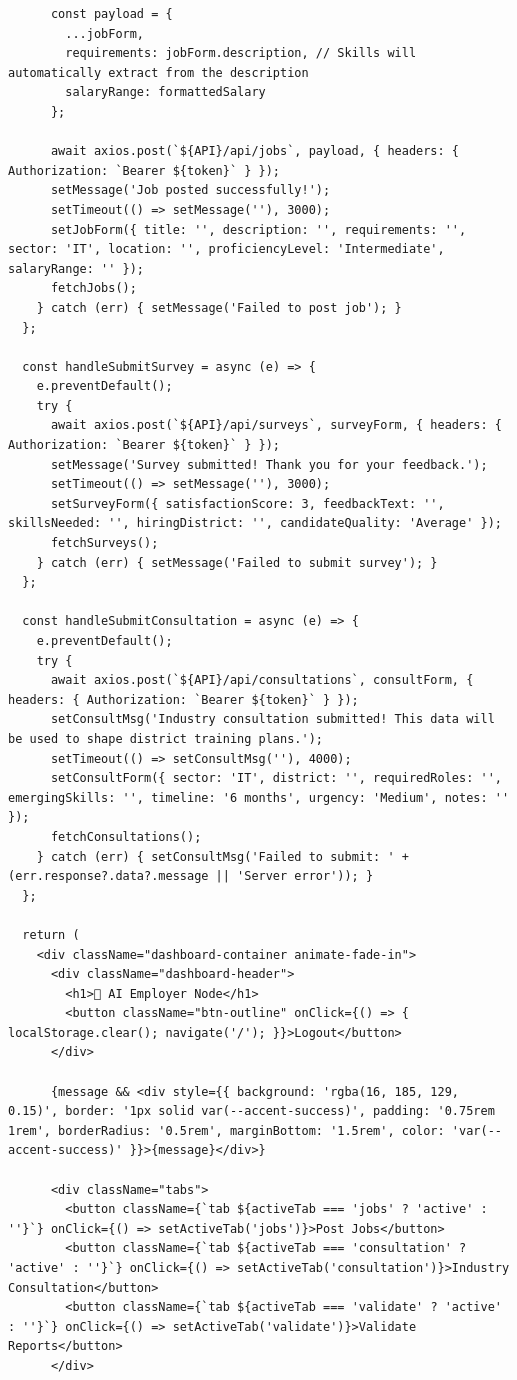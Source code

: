 \documentclass[12pt,a4paper]{report}
\begin{document}
\begin{verbatim}
      const payload = {
        ...jobForm,
        requirements: jobForm.description, // Skills will automatically extract from the description
        salaryRange: formattedSalary
      };

      await axios.post(`${API}/api/jobs`, payload, { headers: { Authorization: `Bearer ${token}` } });
      setMessage('Job posted successfully!');
      setTimeout(() => setMessage(''), 3000);
      setJobForm({ title: '', description: '', requirements: '', sector: 'IT', location: '', proficiencyLevel: 'Intermediate', salaryRange: '' });
      fetchJobs();
    } catch (err) { setMessage('Failed to post job'); }
  };

  const handleSubmitSurvey = async (e) => {
    e.preventDefault();
    try {
      await axios.post(`${API}/api/surveys`, surveyForm, { headers: { Authorization: `Bearer ${token}` } });
      setMessage('Survey submitted! Thank you for your feedback.');
      setTimeout(() => setMessage(''), 3000);
      setSurveyForm({ satisfactionScore: 3, feedbackText: '', skillsNeeded: '', hiringDistrict: '', candidateQuality: 'Average' });
      fetchSurveys();
    } catch (err) { setMessage('Failed to submit survey'); }
  };

  const handleSubmitConsultation = async (e) => {
    e.preventDefault();
    try {
      await axios.post(`${API}/api/consultations`, consultForm, { headers: { Authorization: `Bearer ${token}` } });
      setConsultMsg('Industry consultation submitted! This data will be used to shape district training plans.');
      setTimeout(() => setConsultMsg(''), 4000);
      setConsultForm({ sector: 'IT', district: '', requiredRoles: '', emergingSkills: '', timeline: '6 months', urgency: 'Medium', notes: '' });
      fetchConsultations();
    } catch (err) { setConsultMsg('Failed to submit: ' + (err.response?.data?.message || 'Server error')); }
  };

  return (
    <div className="dashboard-container animate-fade-in">
      <div className="dashboard-header">
        <h1>🤖 AI Employer Node</h1>
        <button className="btn-outline" onClick={() => { localStorage.clear(); navigate('/'); }}>Logout</button>
      </div>

      {message && <div style={{ background: 'rgba(16, 185, 129, 0.15)', border: '1px solid var(--accent-success)', padding: '0.75rem 1rem', borderRadius: '0.5rem', marginBottom: '1.5rem', color: 'var(--accent-success)' }}>{message}</div>}

      <div className="tabs">
        <button className={`tab ${activeTab === 'jobs' ? 'active' : ''}`} onClick={() => setActiveTab('jobs')}>Post Jobs</button>
        <button className={`tab ${activeTab === 'consultation' ? 'active' : ''}`} onClick={() => setActiveTab('consultation')}>Industry Consultation</button>
        <button className={`tab ${activeTab === 'validate' ? 'active' : ''}`} onClick={() => setActiveTab('validate')}>Validate Reports</button>
      </div>


\end{verbatim}
\end{document}
